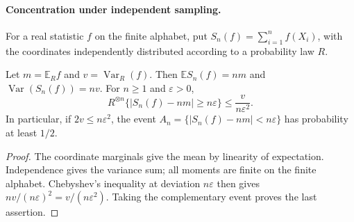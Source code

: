 \paragraph{Concentration under independent sampling.}
For a real statistic $f$ on the finite alphabet, put
$S_n(f)=\sum_{i=1}^n f(X_i)$, with the coordinates independently
distributed according to a probability law $R$.

\begin{lemma}
\label{lem:iid-typical-set}
Let $m=\mathbb E_Rf$ and $v=\operatorname{Var}_R(f)$.
Then $\mathbb E S_n(f)=nm$ and
$\operatorname{Var}(S_n(f))=nv$. For $n\ge1$ and $\varepsilon>0$,
\[
 R^{\otimes n}\{|S_n(f)-nm|\ge n\varepsilon\}
 \le\frac{v}{n\varepsilon^2}.
\]
In particular, if $2v\le n\varepsilon^2$, the event
$A_n=\{|S_n(f)-nm|<n\varepsilon\}$ has probability at least $1/2$.
\end{lemma}
\begin{proof}
The coordinate marginals give the mean by linearity of expectation.
Independence gives the variance sum; all moments are finite on the
finite alphabet. Chebyshev's inequality at deviation $n\varepsilon$
then gives $nv/(n\varepsilon)^2=v/(n\varepsilon^2)$.
Taking the complementary event proves the last assertion.
\end{proof}
